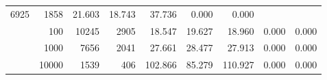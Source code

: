 \begin{table}
\begin{tabular}{rrrrrrrrr}
						
							    
							     6925  & 1858  
	                           & 21.603 & 18.743 & 37.736
	                           & 0.000 & 0.000  \\
	                
	            
					 &  
					 
					\multirow{ 1 }{*}{ 100 } &
					
						
							    
							     10245  & 2905  
	                           & 18.547 & 19.627 & 18.960
	                           & 0.000 & 0.000  \\
	                
	            
					 &  
					 
					\multirow{ 1 }{*}{ 1000 } &
					
						
							    
							     7656  & 2041  
	                           & 27.661 & 28.477 & 27.913
	                           & 0.000 & 0.000  \\
	                
	            
					 &  
					 
					\multirow{ 1 }{*}{ 10000 } &
					
						
							    
							     1539  & 406  
	                           & 102.866 & 85.279 & 110.927
	                           & 0.000 & 0.000  \\
	                
	            
	        

\hline

\end{tabular}
\end{table}
\clearpage


	    
	


